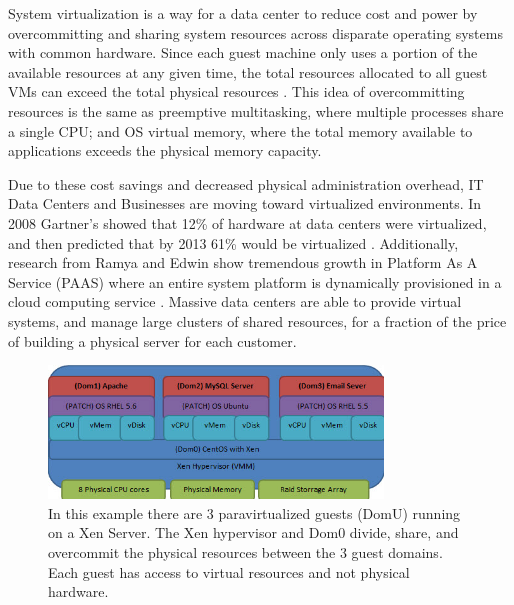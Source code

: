 System virtualization is a way for a data center to reduce cost and power by overcommitting and sharing system resources across disparate operating systems with common hardware.  Since each guest machine only uses a portion of the available resources at any given time, the total resources allocated to all guest VMs can exceed the total physical resources \cite{huber2, amit, buell1}.   This idea of overcommitting resources is the same as preemptive multitasking, where multiple processes share a single CPU; and OS virtual memory, where the total memory available to applications exceeds the physical memory capacity.   

\indent Due to these cost savings and decreased physical administration overhead, IT Data Centers and Businesses are moving toward virtualized environments.  In 2008 Gartner’s showed that 12\% of hardware at data centers were virtualized, and then predicted that by 2013 61\% would be virtualized \cite{gartners}.   Additionally, research from Ramya and Edwin show tremendous growth in Platform As A Service (PAAS) where an entire system platform is dynamically provisioned in a cloud computing service \cite{ramya}.   Massive data centers are able to provide virtual systems, and manage large clusters of shared resources, for a fraction of the price of building a physical server for each customer.

\begin{figure}[!b]
  \begin{center}
    \includegraphics[width=3.5in]{images/VirtualizationExample.jpg}
  \end{center}

  \caption{\small In this example there are 3 paravirtualized guests (DomU) running on a Xen Server.  The Xen hypervisor and Dom0 divide, share, and overcommit the physical resources between the 3 guest domains.  Each guest has access to virtual resources and not physical hardware.}
  \label{fig-VirtualizationExample.pdf}
\end{figure}

